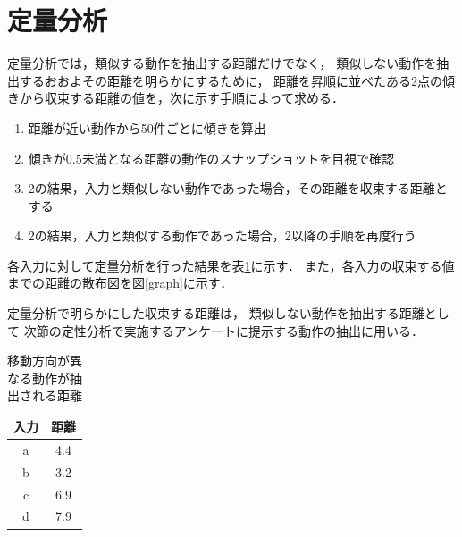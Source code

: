 \documentclass[11pt]{jreport}
\begin{document}
\section{定量分析}
\label{teiryou}
定量分析では，類似する動作を抽出する距離だけでなく，
類似しない動作を抽出するおおよその距離を明らかにするために，
距離を昇順に並べたある2点の傾きから収束する距離の値を，次に示す手順によって求める．

\begin{enumerate}
    \item 距離が近い動作から50件ごとに傾きを算出
    \item 傾きが0.5未満となる距離の動作のスナップショットを目視で確認
    \item 2の結果，入力と類似しない動作であった場合，その距離を収束する距離とする
    \item 2の結果，入力と類似する動作であった場合，2以降の手順を再度行う
\end{enumerate}

各入力に対して定量分析を行った結果を表\ref{quantitativeresult}に示す．
また，各入力の収束する値までの距離の散布図を図\ref{graph}に示す．

定量分析で明らかにした収束する距離は，
類似しない動作を抽出する距離として
次節の定性分析で実施するアンケートに提示する動作の抽出に用いる．
        
\begin{table}[H]
    \caption{移動方向が異なる動作が抽出される距離}
    \label{quantitativeresult}
    \centering
    \begin{tabular}{c|c}
    \hline
    入力 & 距離 \\
    \hline \hline
    a & 4.4 \\
    \hline
    b & 3.2 \\
    \hline
    c & 6.9 \\
    \hline
    d & 7.9 \\
    \hline
    \end{tabular}
\end{table}
\end{document}
